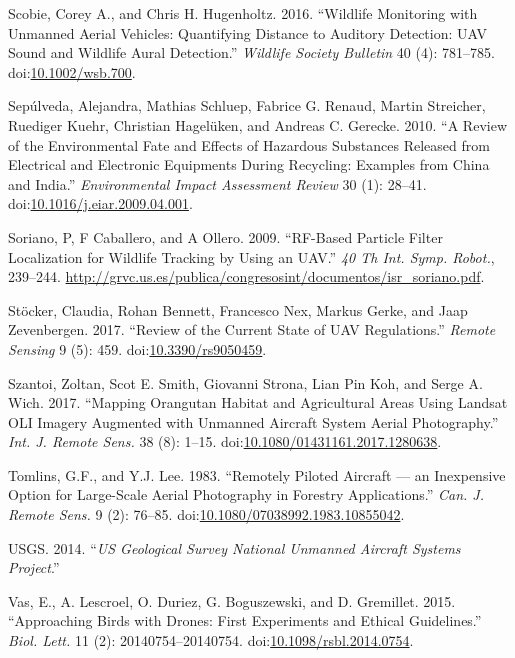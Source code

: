 \documentclass[]{interact}
\theoremstyle{plain}%
\theoremstyle{definition}
\theoremstyle{remark}
\begin{document}
\hypertarget{ref-scobie_wildlife_2016}{}
Scobie, Corey A., and Chris H. Hugenholtz. 2016. ``Wildlife Monitoring
with Unmanned Aerial Vehicles: Quantifying Distance to Auditory
Detection: UAV Sound and Wildlife Aural Detection.'' \emph{Wildlife
Society Bulletin} 40 (4): 781--785.
doi:\href{https://doi.org/10.1002/wsb.700}{10.1002/wsb.700}.

\hypertarget{ref-sepulveda_review_2010}{}
Sepúlveda, Alejandra, Mathias Schluep, Fabrice G. Renaud, Martin
Streicher, Ruediger Kuehr, Christian Hagelüken, and Andreas C. Gerecke.
2010. ``A Review of the Environmental Fate and Effects of Hazardous
Substances Released from Electrical and Electronic Equipments During
Recycling: Examples from China and India.'' \emph{Environmental Impact
Assessment Review} 30 (1): 28--41.
doi:\href{https://doi.org/10.1016/j.eiar.2009.04.001}{10.1016/j.eiar.2009.04.001}.

\hypertarget{ref-soriano_rf-based_2009}{}
Soriano, P, F Caballero, and A Ollero. 2009. ``RF-Based Particle Filter
Localization for Wildlife Tracking by Using an UAV.'' \emph{40 Th Int.
Symp. Robot.}, 239--244.
\url{http://grvc.us.es/publica/congresosint/documentos/isr_soriano.pdf}.

\hypertarget{ref-stocker_review_2017}{}
Stöcker, Claudia, Rohan Bennett, Francesco Nex, Markus Gerke, and Jaap
Zevenbergen. 2017. ``Review of the Current State of UAV Regulations.''
\emph{Remote Sensing} 9 (5): 459.
doi:\href{https://doi.org/10.3390/rs9050459}{10.3390/rs9050459}.

\hypertarget{ref-szantoi_mapping_2017}{}
Szantoi, Zoltan, Scot E. Smith, Giovanni Strona, Lian Pin Koh, and Serge
A. Wich. 2017. ``Mapping Orangutan Habitat and Agricultural Areas Using
Landsat OLI Imagery Augmented with Unmanned Aircraft System Aerial
Photography.'' \emph{Int. J. Remote Sens.} 38 (8): 1--15.
doi:\href{https://doi.org/10.1080/01431161.2017.1280638}{10.1080/01431161.2017.1280638}.

\hypertarget{ref-tomlins_remotely_1983}{}
Tomlins, G.F., and Y.J. Lee. 1983. ``Remotely Piloted Aircraft --- an
Inexpensive Option for Large-Scale Aerial Photography in Forestry
Applications.'' \emph{Can. J. Remote Sens.} 9 (2): 76--85.
doi:\href{https://doi.org/10.1080/07038992.1983.10855042}{10.1080/07038992.1983.10855042}.

\hypertarget{ref-USGS2014}{}
USGS. 2014. ``\emph{US Geological Survey National Unmanned Aircraft
Systems Project}.''

\hypertarget{ref-vas_approaching_2015}{}
Vas, E., A. Lescroel, O. Duriez, G. Boguszewski, and D. Gremillet. 2015.
``Approaching Birds with Drones: First Experiments and Ethical
Guidelines.'' \emph{Biol. Lett.} 11 (2): 20140754--20140754.
doi:\href{https://doi.org/10.1098/rsbl.2014.0754}{10.1098/rsbl.2014.0754}.
\end{document}
